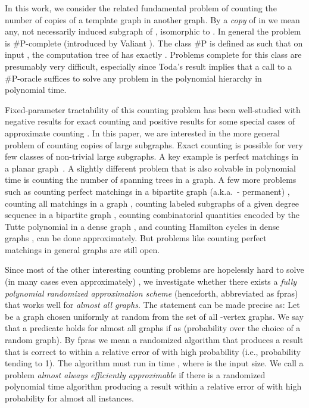 \documentclass[11pt]{article}
\begin{document}
In this work, we consider the related fundamental problem of counting the number of copies of a template graph in another graph. By a {\em copy} of  in  we mean any, not necessarily induced subgraph of , isomorphic to . In general the problem is \#P-complete (introduced by Valiant \cite{val}). The class \#P is defined as   such that on input , the computation tree of  has exactly  . Problems co\-mplete for this class are presumably very difficult, especially since Toda's result \cite{toda} implies that a call to a \#P-oracle suffices to solve any problem in the polynomial hierarchy in polynomial time. 

Fixed-parameter tractability of this counting problem has been well-studied with negative results for exact counting \cite{grohe} and positive results for some special cases of approximate counting \cite{arvind}. In this paper, we are interested in the more general problem of counting copies of large subgraphs. Exact counting is possible for very few classes of non-trivial large subgraphs. A key example is perfect matchings in a planar graph~\cite{kat}. A slightly different problem that is also solvable in polynomial time is counting the number of spanning trees in a graph. A few more problems such as counting perfect matchings in a bipartite graph (a.k.a.\ - permanent) \cite{jsv},  counting all matchings in a graph \cite{ising}, counting labeled subgraphs of a given degree sequence in a bipartite graph \cite{ivana}, counting combinatorial quantities encoded by the Tutte polynomial in a dense graph  \cite{noga1},  and counting Hamilton cycles in dense graphs \cite{fd}, can be done approximately. But problems like counting perfect matchings in general graphs are still open.

Since most of the other interesting counting problems are hopelessly hard to solve (in many cases even approximately) \cite{jer}, we investigate whether there exists a {\em fully polynomial randomized approximation scheme} (henceforth, abbreviated as fpras) that works well for {\em almost all graphs}. The statement can be made precise as: Let  be a graph chosen uniformly at random from the set of all -vertex graphs. We say that a predicate  holds for almost all graphs if  as  (probability over the choice of a random graph). By fpras we mean a randomized algorithm  that produces a result that is correct to within a relative error of  with high probability (i.e., probability tending to 1). The algorithm must run in time , where  is the input size. We call a problem {\em almost always efficiently approximable} if there is a randomized polynomial time algorithm producing a result within a relative error of  with high probability for almost all instances.
\end{document}
